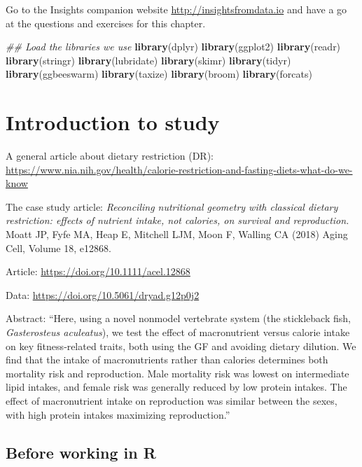 \documentclass[]{book}
\newenvironment{Shaded}{\begin{snugshade}}{\end{snugshade}}
\newcommand{\CommentTok}[1]{\textcolor[rgb]{0.56,0.35,0.01}{\textit{#1}}}
\newcommand{\KeywordTok}[1]{\textcolor[rgb]{0.13,0.29,0.53}{\textbf{#1}}}
\newcommand{\NormalTok}[1]{#1}
\begin{document}
Go to the Insights companion website \url{http://insightsfromdata.io} and have a go at the questions and exercises for this chapter.

\begin{Shaded}
\begin{Highlighting}[]
\CommentTok{## Load the libraries we use}
\KeywordTok{library}\NormalTok{(dplyr)}
\KeywordTok{library}\NormalTok{(ggplot2)}
\KeywordTok{library}\NormalTok{(readr)}
\KeywordTok{library}\NormalTok{(stringr)}
\KeywordTok{library}\NormalTok{(lubridate)}
\KeywordTok{library}\NormalTok{(skimr)}
\KeywordTok{library}\NormalTok{(tidyr)}
\KeywordTok{library}\NormalTok{(ggbeeswarm)}
\KeywordTok{library}\NormalTok{(taxize)}
\KeywordTok{library}\NormalTok{(broom)}
\KeywordTok{library}\NormalTok{(forcats)}
\end{Highlighting}
\end{Shaded}

\hypertarget{introduction-to-study}{%
\chapter{Introduction to study}\label{introduction-to-study}}

A general article about dietary restriction (DR): \url{https://www.nia.nih.gov/health/calorie-restriction-and-fasting-diets-what-do-we-know}

The case study article: \emph{Reconciling nutritional geometry with classical dietary restriction: effects of nutrient intake, not calories, on survival and reproduction.} Moatt JP, Fyfe MA, Heap E, Mitchell LJM, Moon F, Walling CA (2018) Aging Cell, Volume 18, e12868.

Article: \url{https://doi.org/10.1111/acel.12868}

Data: \url{https://doi.org/10.5061/dryad.g12p0j2}

Abstract: ``Here, using a novel nonmodel vertebrate system (the stickleback fish, \emph{Gasterosteus aculeatus}), we test the effect of macronutrient versus calorie intake on key fitness‐related traits, both using the GF and avoiding dietary dilution. We find that the intake of macronutrients rather than calories determines both mortality risk and reproduction. Male mortality risk was lowest on intermediate lipid intakes, and female risk was generally reduced by low protein intakes. The effect of macronutrient intake on reproduction was similar between the sexes, with high protein intakes maximizing reproduction.''

\hypertarget{before-working-in-r}{%
\section{Before working in R}\label{before-working-in-r}}
\end{document}
